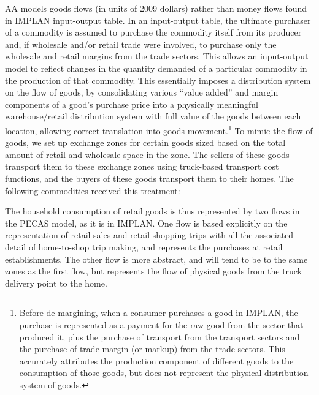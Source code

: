 AA models goods flows (in units of 2009 dollars) rather than money flows found in IMPLAN input-output table. In an input-output table, the ultimate purchaser of a commodity is assumed to purchase the commodity itself from its producer and, if wholesale and/or retail trade were involved, to purchase only the wholesale and retail margins from the trade sectors. This allows an input-output model to reflect changes in the quantity demanded of a particular commodity in the production of that commodity. This essentially imposes a distribution system on the flow of goods, by consolidating various ``value added'' and margin components of a good's purchase price into a physically meaningful warehouse/retail distribution system with full value of the goods between each location, allowing correct translation into goods movement.\footnote{Before de-margining, when a consumer purchases a good in IMPLAN, the purchase is represented as a payment for the raw good from the sector that produced it, plus the purchase of transport from the transport sectors and the purchase of trade margin (or markup) from the trade sectors. This accurately attributes the production component of different goods to the consumption of those goods, but does not represent the physical distribution system of goods.} To mimic the flow of goods, we set up exchange zones for certain goods sized based on the total amount of retail and wholesale space in the zone. The sellers of these goods transport them to these exchange zones using truck-based transport cost functions, and the buyers of these goods transport them to their homes. The following commodities received this treatment: 
\begin{quotation}
\end{quotation}

The household consumption of retail goods is thus represented by two flows in the PECAS model, as it is in IMPLAN.  One flow is based explicitly on the representation of retail sales and retail shopping trips with all the associated detail of home-to-shop trip making, and represents the purchases at retail establishments.  The other flow is more abstract, and will tend to be to the same zones as the first flow, but represents the flow of physical goods from the truck delivery point to the home.


